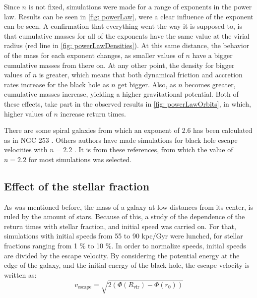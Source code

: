 		Since $n$ is not fixed, simulations were made for a range of exponents in the power law. Results can be seen in \autoref{fig: powerLaw}, were a clear influence of the exponent can be seen. A confirmation that everything went the way it is supposed to, is that cumulative masses for all of the exponents have the same value at the virial radius (red line in \autoref{fig: powerLawDensities}). At this same distance, the behavior of the mass for each exponent changes, as smaller values of $n$ have a bigger cumulative masses from there on. At any other point, the density for bigger values of $n$ is greater, which means that both dynamical friction and accretion rates increase for the black hole as $n$ get bigger. Also, as $n$ becomes greater, cumulative masses increase, yielding a higher gravitational potential. Both of these effects, take part in the observed results in \autoref{fig: powerLawOrbits}, in which, higher values of $n$ increase return times.
		
		There are some spiral galaxies from which an exponent of 2.6 has been calculated as in NGC 253 \cite{sorai2000distribution}. Others authors have made simulations for black hole escape velocities with $n = 2.2$ \cite{tanaka2009assembly, choksi2017recoiling}. It is from these references, from which the value of $n = 2.2$ for most simulations was selected.
		
	\subsection{Effect of the stellar fraction}
		As was mentioned before, the mass of a galaxy at low distances from its center, is ruled by the amount of stars. Because of this, a study of the dependence of the return times with stellar fraction, and initial speed was carried on. For that, simulations with initial speeds from 55 to 90 kpc/Gyr were lunched, for stellar fractions ranging from 1 \% to 10 \%. In order to normalize speeds, initial speeds are divided by the escape velocity. By considering the potential energy at the edge of the galaxy, and the initial energy of the black hole, the escape velocity is written as:
		\begin{equation}
			v_\text{escape} = \sqrt{2 \left(\Phi(R_\text{vir}) - \Phi(r_0)\right)}
		\end{equation}
		
